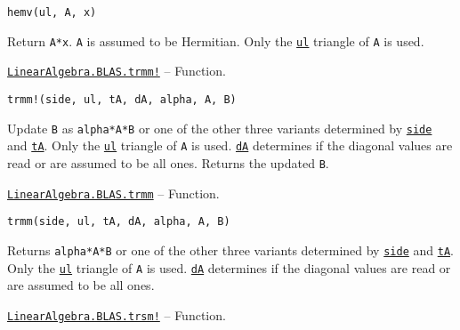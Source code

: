 \begin{adjustwidth}{2em}{0pt}


\begin{verbatim}
hemv(ul, A, x)
\end{verbatim}

Return \texttt{A*x}. \texttt{A} is assumed to be Hermitian. Only the \hyperlink{13880289478825450693}{\texttt{ul}} triangle of \texttt{A} is used.



\end{adjustwidth}
\hypertarget{8591334681358631512}{}
\hyperlink{8591334681358631512}{\texttt{LinearAlgebra.BLAS.trmm!}}  -- {Function.}

\begin{adjustwidth}{2em}{0pt}


\begin{verbatim}
trmm!(side, ul, tA, dA, alpha, A, B)
\end{verbatim}

Update \texttt{B} as \texttt{alpha*A*B} or one of the other three variants determined by \hyperlink{3128026147631247774}{\texttt{side}} and \hyperlink{15951037910221396131}{\texttt{tA}}. Only the \hyperlink{13880289478825450693}{\texttt{ul}} triangle of \texttt{A} is used. \hyperlink{285101993251198425}{\texttt{dA}} determines if the diagonal values are read or are assumed to be all ones. Returns the updated \texttt{B}.



\end{adjustwidth}
\hypertarget{1143998968915321685}{}
\hyperlink{1143998968915321685}{\texttt{LinearAlgebra.BLAS.trmm}}  -- {Function.}

\begin{adjustwidth}{2em}{0pt}


\begin{verbatim}
trmm(side, ul, tA, dA, alpha, A, B)
\end{verbatim}

Returns \texttt{alpha*A*B} or one of the other three variants determined by \hyperlink{3128026147631247774}{\texttt{side}} and \hyperlink{15951037910221396131}{\texttt{tA}}. Only the \hyperlink{13880289478825450693}{\texttt{ul}} triangle of \texttt{A} is used. \hyperlink{285101993251198425}{\texttt{dA}} determines if the diagonal values are read or are assumed to be all ones.



\end{adjustwidth}
\hypertarget{3732597007619096495}{}
\hyperlink{3732597007619096495}{\texttt{LinearAlgebra.BLAS.trsm!}}  -- {Function.}

